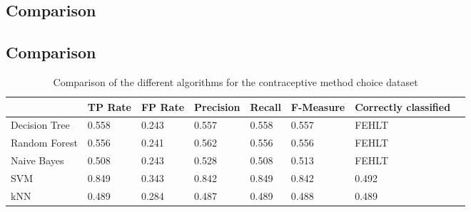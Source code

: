 \documentclass[paper=a4, fontsize=11pt]{scrartcl} %
\numberwithin{equation}{section} %
\numberwithin{figure}{section} %
\numberwithin{table}{section} %
\begin{document}
\subsection{Comparison}

\subsection{Comparison}

\begin{table}[h]
\centering
\begin{tabular}{llllllll}
	\toprule
									&TP Rate   	&FP Rate   &Precision &Recall  &F-Measure   &  Correctly classified\\
	\midrule
	Decision Tree 	&  0.558   & 0.243   & 0.557     	& 0.558  & 0.557     & FEHLT\\
  Random Forest		&  0.556   & 0.241   & 0.562     	& 0.556  & 0.556     & FEHLT\\
  Naive Bayes		 	&  0.508   & 0.243   & 0.528     	& 0.508  & 0.513     & FEHLT\\
  SVM							& 0.849    & 0.343   &0.842   		& 0.849  & 0.842 		 & 0.492\\
  kNN							&0.489     &0.284    &0.487     	& 0.489  & 0.488 		 & 0.489\\
	\bottomrule
\end{tabular}
\caption{Comparison of the different algorithms for the contraceptive method choice dataset}
\end{table}

\end{document}
